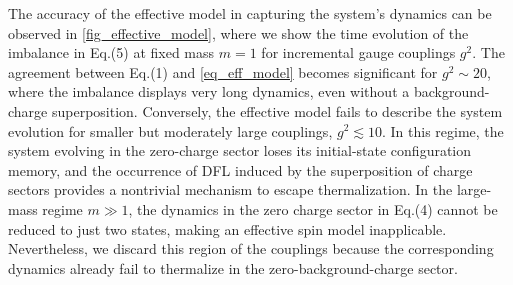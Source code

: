 \documentclass[aps,prl,reprint,twocolumn,superscriptaddress,floatfix,nofootinbib]{revtex4-2}
\begin{document}
The accuracy of the effective model in capturing the system's dynamics can be observed in \cref{fig_effective_model}, where we show the time evolution of the imbalance in Eq.(5) at fixed mass $m=1$ for incremental gauge couplings $g^2$.
The agreement between Eq.(1) and \cref{eq_eff_model} becomes significant for $g^2\sim 20$, where the imbalance displays very long dynamics, even without a background-charge superposition.
Conversely, the effective model fails to describe the system evolution for smaller but moderately large couplings, $g^2\lesssim 10$.
In this regime, the system evolving in the zero-charge sector loses its initial-state configuration memory, and the occurrence of DFL induced by the superposition of charge sectors provides a nontrivial mechanism to escape thermalization.
In the large-mass regime $m\gg 1$, the dynamics in the zero charge sector in Eq.(4) cannot be reduced to just two states, making an effective spin model inapplicable.
Nevertheless, we discard this region of the couplings because the corresponding dynamics already fail to thermalize in the zero-background-charge sector.
\end{document}
